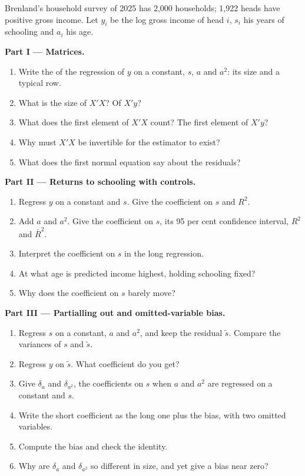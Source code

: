 \begin{problem}
\label{pb:b2:multiple-regression:1}
Brenland's household survey of 2025 has 2,000 households; 1,922 heads have positive gross income. Let $y_i$ be the log
gross income of head $i$, $s_i$ his years of schooling and $a_i$ his age.

\medskip
\noindent\textbf{Part I --- Matrices.}
\begin{enumerate}
  \item Write the  of the regression of $y$ on a constant, $s$, $a$ and $a^2$: its size and a typical row.
  \item What is the size of $X'X$? Of $X'y$?
  \item What does the first element of $X'X$ count? The first element of $X'y$?
  \item Why must $X'X$ be invertible for the estimator to exist?
  \item What does the first normal equation say about the residuals?
\end{enumerate}

\medskip
\noindent\textbf{Part II --- Returns to schooling with controls.}
\begin{enumerate}[resume]
  \item Regress $y$ on a constant and $s$. Give the coefficient on $s$ and $R^2$.
  \item Add $a$ and $a^2$. Give the coefficient on $s$, its 95 per cent confidence interval, $R^2$ and $\bar R^2$.
  \item Interpret the coefficient on $s$ in the long regression.
  \item At what age is predicted income highest, holding schooling fixed?
  \item Why does the coefficient on $s$ barely move?
\end{enumerate}

\medskip
\noindent\textbf{Part III --- Partialling out and omitted-variable bias.}
\begin{enumerate}[resume]
  \item Regress $s$ on a constant, $a$ and $a^2$, and keep the residual $\tilde s$. Compare the variances of $s$ and $\tilde s$.
  \item Regress $y$ on $\tilde s$. What coefficient do you get?
  \item Give $\delta_a$ and $\delta_{a^2}$, the coefficients on $s$ when $a$ and $a^2$ are regressed on a constant and $s$.
  \item Write the short coefficient as the long one plus the bias, with two omitted variables.
  \item Compute the bias and check the identity.
  \item Why are $\delta_a$ and $\delta_{a^2}$ so different in size, and yet give a bias near zero?
\end{enumerate}


\end{problem}
